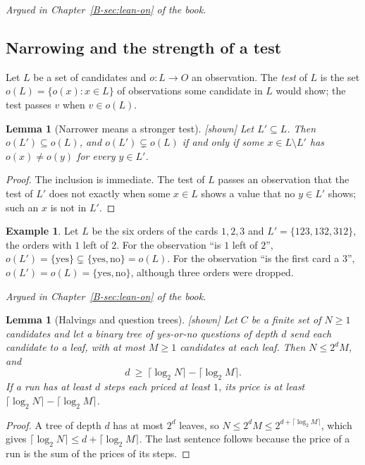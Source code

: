 \documentclass[11pt, a4paper]{article}
\theoremstyle{plain}
\newtheorem{lemma}[theorem]{Lemma}
\theoremstyle{definition}
\newtheorem{example}[theorem]{Example}
\theoremstyle{remark}
\newcommand{\argued}[1]{\par\noindent\textit{Argued in Chapter~\ref{B-#1} of the book.}\par}
\newcommand{\kind}[1]{\textup{[#1]}}
\begin{document}
\argued{sec:lean-on}

\subsection*{Narrowing and the strength of a test}

Let $L$ be a set of candidates and $o:L\to O$ an observation. The \emph{test} of $L$ is the set
$o(L)=\{o(x):x\in L\}$ of observations some candidate in $L$ would show; the test passes $v$ when
$v\in o(L)$.

\begin{lemma}[Narrower means a stronger test]\label{spec:narrower-test} \kind{shown}
Let $L'\subseteq L$. Then $o(L')\subseteq o(L)$, and $o(L')\subsetneq o(L)$ if and only if some
$x\in L\setminus L'$ has $o(x)\ne o(y)$ for every $y\in L'$.
\end{lemma}

\begin{proof}
The inclusion is immediate. The test of $L$ passes an observation that the test of $L'$ does not exactly
when some $x\in L$ shows a value that no $y\in L'$ shows; such an $x$ is not in $L'$.
\end{proof}

\begin{example}\label{spec:cards-test}
Let $L$ be the six orders of the cards $1,2,3$ and $L'=\{123,132,312\}$, the orders with $1$ left of $2$.
For the observation ``is $1$ left of $2$'', $o(L')=\{\mathrm{yes}\}\subsetneq\{\mathrm{yes},\mathrm{no}\}=o(L)$.
For the observation ``is the first card a $3$'', $o(L')=o(L)=\{\mathrm{yes},\mathrm{no}\}$, although three
orders were dropped.
\end{example}

\argued{sec:lean-on}

\begin{lemma}[Halvings and question trees]\label{spec:question-tree} \kind{shown}
Let $C$ be a finite set of $N\ge1$ candidates and let a binary tree of yes-or-no questions of depth $d$
send each candidate to a leaf, with at most $M\ge1$ candidates at each leaf. Then $N\le 2^dM$, and
\[
d\ \ge\ \lceil\log_2 N\rceil-\lceil\log_2 M\rceil .
\]
If a run has at least $d$ steps each priced at least $1$, its price is at least
$\lceil\log_2 N\rceil-\lceil\log_2 M\rceil$.
\end{lemma}

\begin{proof}
A tree of depth $d$ has at most $2^d$ leaves, so $N\le 2^dM\le 2^{d+\lceil\log_2M\rceil}$, which gives
$\lceil\log_2N\rceil\le d+\lceil\log_2M\rceil$. The last sentence follows because the price of a run is
the sum of the prices of its steps.
\end{proof}
\end{document}
